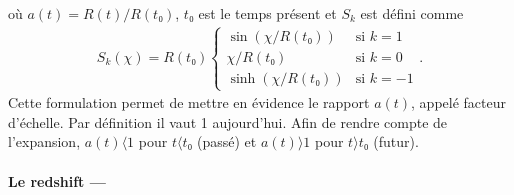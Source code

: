 \documentclass[11pt, twoside, a4paper, openright]{report}
\begin{document}
où $a(t) = R(t) / R(t₀)$,  $t₀$ est le temps présent et $S_{k}$ est défini comme
\begin{align}
  S_{k}(\chi) = R(t₀) \left\{
    \begin{array}{ll}
      \sin(\chi / R(t₀)) & \mbox{si } k = 1 \\
      \chi / R(t₀) & \textrm{si } k = 0 \\
      \sinh(\chi / R(t₀)) & \mbox{si } k = -1
    \end{array}
\right..
\end{align}
Cette formulation permet de mettre en évidence le rapport $a(t)$, appelé facteur d'échelle. Par définition il vaut 1 aujourd'hui. Afin de rendre compte de l'expansion, $a(t) \langle 1$ pour $t \langle t₀$ (passé) et $a(t) \rangle 1$ pour $t \rangle t₀$ (futur).

\paragraph{Le redshift —}
\label{par:redshift}
\end{document}
